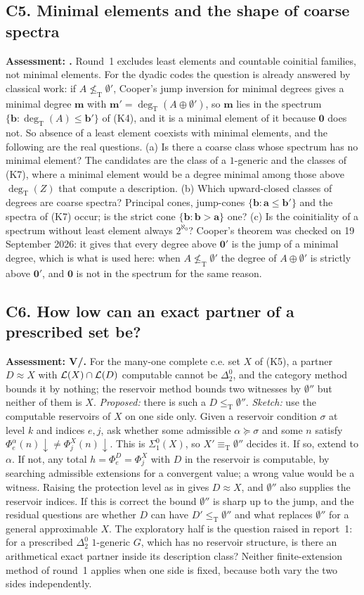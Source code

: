 \documentclass[11pt,a4paper]{article}
\newcommand{\leT}{\leq_{\mathrm T}}
\newcommand{\eqT}{\equiv_{\mathrm T}}
\newcommand{\degT}{\operatorname{deg}_{\mathrm T}}
\newcommand{\zero}{\mathbf0}
\newcommand{\adeg}{\mathbf a}\newcommand{\bdeg}{\mathbf b}
\newcommand{\problemheading}[3]{\subsection{#1. #2}\label{entry:#1}\noindent\textbf{Assessment: #3.}\enspace}
\theoremstyle{definition}\newtheorem{definition}[theorem]{Definition}
\theoremstyle{remark}\newtheorem{remark}[theorem]{Remark}
\begin{document}
\problemheading{C5}{Minimal elements and the shape of coarse spectra}{\E{}}
Round~1 excludes least elements and countable coinitial families, not minimal elements. For the dyadic codes the question is already answered by classical work: if $A\nleq_{\mathrm T}\emptyset'$, Cooper's jump inversion for minimal degrees \cite{CooperMinimal} gives a minimal degree $\mathbf m$ with $\mathbf m'=\degT(A\oplus\emptyset')$, so $\mathbf m$ lies in the spectrum $\{\bdeg:\degT(A)\le\bdeg'\}$ of (K4), and it is a minimal element of it because $\zero$ does not. So absence of a least element coexists with minimal elements, and the following are the real questions. (a) Is there a coarse class whose spectrum has no minimal element? The candidates are the class of a $1$-generic and the classes of (K7), where a minimal element would be a degree minimal among those above $\degT(Z)$ that compute a description. (b) Which upward-closed classes of degrees are coarse spectra? Principal cones, jump-cones $\{\bdeg:\adeg\le\bdeg'\}$ and the spectra of (K7) occur; is the strict cone $\{\bdeg:\bdeg>\adeg\}$ one? (c) Is the coinitiality of a spectrum without least element always $2^{\aleph_0}$? Cooper's theorem was checked on 19 September 2026: it gives that every degree above $\zero'$ is the jump of a minimal degree, which is what is used here: when $A\nleq_{\mathrm T}\emptyset'$ the degree of $A\oplus\emptyset'$ is strictly above $\zero'$, and $\zero$ is not in the spectrum for the same reason.

\problemheading{C6}{How low can an exact partner of a prescribed set be?}{V/\E{}}
For the many-one complete c.e. set $X$ of (K5), a partner $D\approx X$ with $\mathcal L(X)\cap\mathcal L(D)$ computable cannot be $\Delta^0_2$, and the category method bounds it by nothing; the reservoir method bounds two witnesses by $\emptyset''$ but neither of them is $X$. \emph{Proposed:} there is such a $D\leT\emptyset''$. \emph{Sketch:} use the computable reservoirs of $X$ on one side only. Given a reservoir condition $\sigma$ at level $k$ and indices $e,j$, ask whether some admissible $\alpha\succeq\sigma$ and some $n$ satisfy $\Phi_e^\alpha(n)\downarrow\ne\Phi_j^X(n)\downarrow$. This is $\Sigma^0_1(X)$, so $X'\eqT\emptyset''$ decides it. If so, extend to $\alpha$. If not, any total $h=\Phi_e^D=\Phi_j^X$ with $D$ in the reservoir is computable, by searching admissible extensions for a convergent value; a wrong value would be a witness. Raising the protection level as in \cite[Theorem 7.2]{Synthesis} gives $D\approx X$, and $\emptyset''$ also supplies the reservoir indices. If this is correct the bound $\emptyset''$ is sharp up to the jump, and the residual questions are whether $D$ can have $D'\leT\emptyset''$ and what replaces $\emptyset''$ for a general approximable $X$. The exploratory half is the question raised in report~1: for a prescribed $\Delta^0_2$ $1$-generic $G$, which has no reservoir structure, is there an arithmetical exact partner inside its description class? Neither finite-extension method of round~1 applies when one side is fixed, because both vary the two sides independently.
\end{document}
